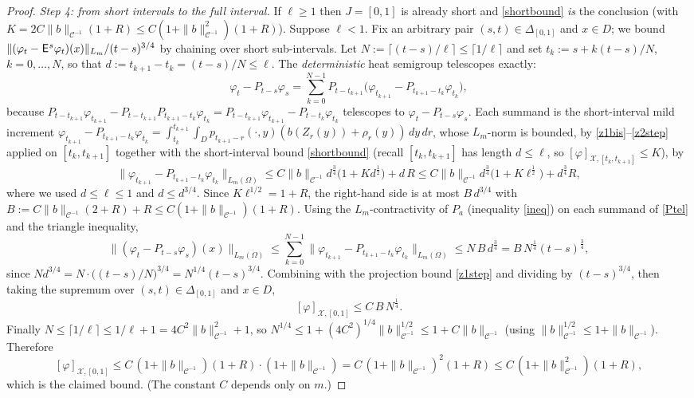 \documentclass[12pt]{article}
\theoremstyle{definition}
\DeclareMathOperator{\1}{\mathbbm{1}}%
\def\E{\hskip.15ex\mathsf{E}\hskip.10ex}
\def\phi{\varphi}
\renewcommand{\ge}{\geqslant}
\renewcommand{\le}{\leqslant}
\newcommand{\C}{\mathcal{C}}
\newcommand{\X}{\mathcal{X}}
\begin{document}
\begin{proof}
\smallskip
\emph{Step 4: from short intervals to the full interval.}
If $\ell\ge1$ then $J=[0,1]$ is already short and \eqref{shortbound} \emph{is} the
conclusion (with $K=2C\|b\|_{\C^{-1}}(1+R)\le C(1+\|b\|_{\C^{-1}}^2)(1+R)$). Suppose
$\ell<1$. Fix an arbitrary pair $(s,t)\in\Delta_{[0,1]}$ and $x\in D$; we bound
$\|(\phi_t-\E^s\phi_t)(x)\|_{L_m}/(t-s)^{3/4}$ by chaining over short sub-intervals.
Let $N:=\lceil (t-s)/\ell\rceil\le\lceil1/\ell\rceil$ and set
$t_k:=s+k(t-s)/N$, $k=0,\dots,N$, so that $d:=t_{k+1}-t_k=(t-s)/N\le\ell$. The
\emph{deterministic} heat semigroup telescopes exactly:
\begin{equation}\label{Ptel}
\phi_t-P_{t-s}\phi_s
=\sum_{k=0}^{N-1} P_{t-t_{k+1}}\bigl(\phi_{t_{k+1}}-P_{t_{k+1}-t_k}\phi_{t_k}\bigr),
\end{equation}
because $P_{t-t_{k+1}}\phi_{t_{k+1}}-P_{t-t_{k+1}}P_{t_{k+1}-t_k}\phi_{t_k}
=P_{t-t_{k+1}}\phi_{t_{k+1}}-P_{t-t_k}\phi_{t_k}$ telescopes to
$\phi_t-P_{t-s}\phi_s$. Each summand is the short-interval mild increment
$\phi_{t_{k+1}}-P_{t_{k+1}-t_k}\phi_{t_k}=\int_{t_k}^{t_{k+1}}\!\int_D
p_{t_{k+1}-r}(\cdot,y)(b(Z_r(y))+\rho_r(y))\,dy\,dr$, whose $L_m$-norm is bounded, by
\eqref{z1bis}--\eqref{z2step} applied on $[t_k,t_{k+1}]$ together with the short-interval
bound \eqref{shortbound} (recall $[t_k,t_{k+1}]$ has length $d\le\ell$, so
$[\phi]_{\X,[t_k,t_{k+1}]}\le K$), by
\[
\bigl\|\phi_{t_{k+1}}-P_{t_{k+1}-t_k}\phi_{t_k}\bigr\|_{L_m(\Omega)}
\le C\|b\|_{\C^{-1}}d^{\frac34}\bigl(1+K d^{\frac12}\bigr)+d\,R
\le C\|b\|_{\C^{-1}}d^{\frac34}\bigl(1+K\ell^{\frac12}\bigr)+d^{\frac34}R ,
\]
where we used $d\le\ell\le1$ and $d\le d^{3/4}$. Since $K\ell^{1/2}=1+R$, the
right-hand side is at most $B\,d^{3/4}$ with $B:=C\|b\|_{\C^{-1}}(2+R)+R\le
C(1+\|b\|_{\C^{-1}})(1+R)$. Using the $L_m$-contractivity of $P_a$
(inequality \eqref{ineq}) on each summand of \eqref{Ptel} and the triangle inequality,
\[
\|(\phi_t-P_{t-s}\phi_s)(x)\|_{L_m(\Omega)}
\le \sum_{k=0}^{N-1}\bigl\|\phi_{t_{k+1}}-P_{t_{k+1}-t_k}\phi_{t_k}\bigr\|_{L_m(\Omega)}
\le N\,B\,d^{\frac34}
= B\,N^{\frac14}(t-s)^{\frac34},
\]
since $N d^{3/4}=N\cdot\bigl((t-s)/N\bigr)^{3/4}=N^{1/4}(t-s)^{3/4}$. Combining with the
projection bound \eqref{z1step} and dividing by $(t-s)^{3/4}$, then taking the supremum
over $(s,t)\in\Delta_{[0,1]}$ and $x\in D$,
\[
[\phi]_{\X,[0,1]}\le C\,B\,N^{\frac14}.
\]
Finally $N\le\lceil1/\ell\rceil\le 1/\ell+1=4C^2\|b\|_{\C^{-1}}^2+1$, so
$N^{1/4}\le 1+(4C^2)^{1/4}\|b\|_{\C^{-1}}^{1/2}\le 1+C\|b\|_{\C^{-1}}$ (using
$\|b\|_{\C^{-1}}^{1/2}\le 1+\|b\|_{\C^{-1}}$). Therefore
\[
[\phi]_{\X,[0,1]}\le C\,(1+\|b\|_{\C^{-1}})(1+R)\cdot(1+\|b\|_{\C^{-1}})
= C\,(1+\|b\|_{\C^{-1}})^2(1+R)\le C\,(1+\|b\|_{\C^{-1}}^2)(1+R),
\]
which is the claimed bound. (The constant $C$ depends only on $m$.)
\end{proof}
\end{document}
